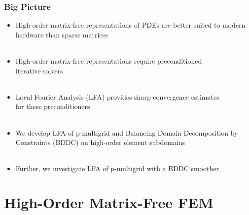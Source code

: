 \documentclass{beamer}
\begin{document}
\begin{frame}
\begin{center}
\frametitle{Big Picture}

\begin{itemize}

\item High-order matrix-free representations of PDEs are better suited to modern hardware than sparse matrices\\

~\\

\item High-order matrix-free representations require preconditioned\\iterative solvers\\

~\\

\item Local Fourier Analysis (LFA) provides sharp convergence estimates\\for these preconditioners\\

~\\

\item We develop LFA of p-multigrid and Balancing Domain Decomposition by Constraints (BDDC) on high-order element subdomains\\

~\\

\item Further, we investigate LFA of p-multigrid with a BDDC smoother

\end{itemize}

\end{center}
\end{frame}

\section{High-Order Matrix-Free FEM}
\end{document}
